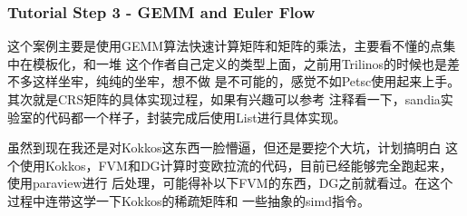\subsubsection{Tutorial Step 3 - GEMM and Euler Flow}
这个案例主要是使用GEMM算法快速计算矩阵和矩阵的乘法，主要看不懂的点集中在模板化，和一堆
这个作者自己定义的类型上面，之前用Trilinos的时候也是差不多这样坐牢，纯纯的坐牢，想不做
是不可能的，感觉不如Petsc使用起来上手。其次就是CRS矩阵的具体实现过程，如果有兴趣可以参考
注释看一下，sandia实验室的代码都一个样子，封装完成后使用List进行具体实现。

虽然到现在我还是对Kokkos这东西一脸懵逼，但还是要挖个大坑，计划搞明白
这个使用Kokkos，FVM和DG计算时变欧拉流的代码，目前已经能够完全跑起来，使用paraview进行
后处理，可能得补以下FVM的东西，DG之前就看过。在这个过程中连带这学一下Kokkos的稀疏矩阵和
一些抽象的simd指令。

